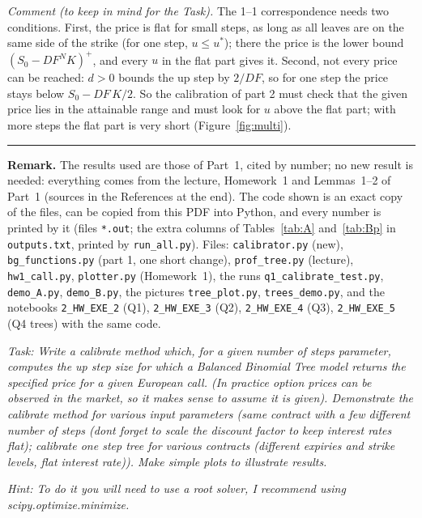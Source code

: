 \documentclass[11pt,a4paper]{article}
\newcommand{\subhead}[1]{\par\medskip\noindent{\large\bfseries #1}\par\smallskip\noindent\ignorespaces}
\newcommand{\parthead}[1]{\par\bigskip\noindent{\LARGE\bfseries #1}\par\noindent\rule{\textwidth}{0.8pt}\par\smallskip}
\begin{document}
\noindent\emph{Comment (to keep in mind for the Task).} The 1--1 correspondence needs two conditions. First, the price is flat for small steps, as long as all leaves are on the same side of the strike (for one step, $u\le u^*$); there the price is the lower bound $(S_0-DF^N K)^+$, and every $u$ in the flat part gives it. Second, not every price can be reached: $d>0$ bounds the up step by $2/DF$, so for one step the price stays below $S_0-DF\,K/2$. So the calibration of part 2 must check that the given price lies in the attainable range and must look for $u$ above the flat part; with more steps the flat part is very short (Figure~\ref{fig:multi}).


\newpage
\parthead{Part 2: Task}\label{part2}

\noindent\textbf{Remark.} The results used are those of Part~1, cited by number; no new result is needed: everything comes from the lecture, Homework~1 and Lemmas~1--2 of Part~1 (sources in the References at the end). The code shown is an exact copy of the files, can be copied from this PDF into Python, and every number is printed by it (files \texttt{*.out}; the extra columns of Tables~\ref{tab:A} and~\ref{tab:Bp} in \texttt{outputs.txt}, printed by \texttt{run\_all.py}). Files: \texttt{calibrator.py} (new), \texttt{bg\_functions.py} (part 1, one short change), \texttt{prof\_tree.py} (lecture), \texttt{hw1\_call.py}, \texttt{plotter.py} (Homework~1), the runs \texttt{q1\_calibrate\_test.py}, \texttt{demo\_A.py}, \texttt{demo\_B.py}, the pictures \texttt{tree\_plot.py}, \texttt{trees\_demo.py}, and the notebooks \texttt{2\_HW\_EXE\_2} (Q1), \texttt{2\_HW\_EXE\_3} (Q2), \texttt{2\_HW\_EXE\_4} (Q3), \texttt{2\_HW\_EXE\_5} (Q4 trees) with the same code.

\subhead{The assignment.}
\emph{Task: Write a calibrate method which, for a given number of steps parameter, computes the up step size for which a Balanced Binomial Tree model returns the specified price for a given European call. (In practice option prices can be observed in the market, so it makes sense to assume it is given). Demonstrate the calibrate method for various input parameters (same contract with a few different number of steps (dont forget to scale the discount factor to keep interest rates flat); calibrate one step tree for various contracts (different expiries and strike levels, flat interest rate)). Make simple plots to illustrate results.}

\noindent\emph{Hint: To do it you will need to use a root solver, I recommend using scipy.optimize.minimize.}
\end{document}
